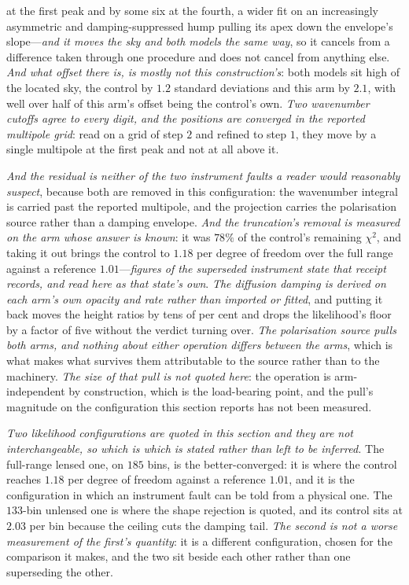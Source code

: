 \documentclass[11pt,a4paper]{article}
\theoremstyle{plain}
\theoremstyle{definition}
\theoremstyle{remark}
\begin{document}
at the first peak and by some six at the fourth, a wider fit on an increasingly asymmetric and
damping-suppressed hump pulling its apex down the envelope's slope---\emph{and it moves the sky and both
models the same way}, so it cancels from a difference taken through one procedure and does not cancel from
anything else.
\emph{And what offset there is, is mostly not this construction's}: both models sit high of the located sky,
the control by $1.2$ standard deviations and this arm by $2.1$, with well over half of this arm's offset being
the control's own. \emph{Two wavenumber cutoffs agree to every digit, and the positions are
converged in the reported multipole grid}: read on a grid of step $2$ and refined to step $1$, they move by a
single multipole at the first peak and not at all above it.

\emph{And the residual is neither of the two instrument faults a reader would reasonably suspect}, because
both are removed in this configuration: the wavenumber integral is carried past the reported multipole, and
the projection carries the polarisation source rather than a damping
envelope. \emph{And the truncation's
removal is measured on the arm whose answer is known}: it was $78\%$ of the control's remaining $\chi^{2}$,
and taking it out brings the control to $1.18$ per degree of freedom over the full range against a reference
$1.01$---\emph{figures of the superseded instrument state that receipt records, and read here as
that state's own}. \emph{The diffusion damping is
derived on each arm's own opacity and rate rather than imported or fitted}, and putting it back moves the
height ratios by tens of per cent and drops the likelihood's floor by a factor of five without the verdict
turning over. \emph{The polarisation source pulls both arms, and
\emph{nothing about either operation differs between the arms}}, which is what makes what
survives them attributable to the source rather than to the machinery. \emph{The size of that pull is
not quoted here}: the operation is arm-independent by construction, which is the load-bearing point,
and the pull's magnitude on the configuration this section reports has not been measured.

\emph{Two likelihood configurations are quoted in this section and they are not interchangeable, so which is which is stated rather than left to be inferred.} The full-range lensed one, on $185$ bins, is the better-converged: it is where the control reaches $1.18$ per degree of freedom against a reference $1.01$, and it is the configuration in which an instrument fault can be told from a physical one. The $133$-bin unlensed one is where the shape rejection is quoted, and its control sits at $2.03$ per bin because the ceiling cuts the damping tail. \emph{The second is not a worse measurement of the first's quantity}: it is a different configuration, chosen for the comparison it makes, and the two sit beside each other rather than one superseding the other.
\end{document}
